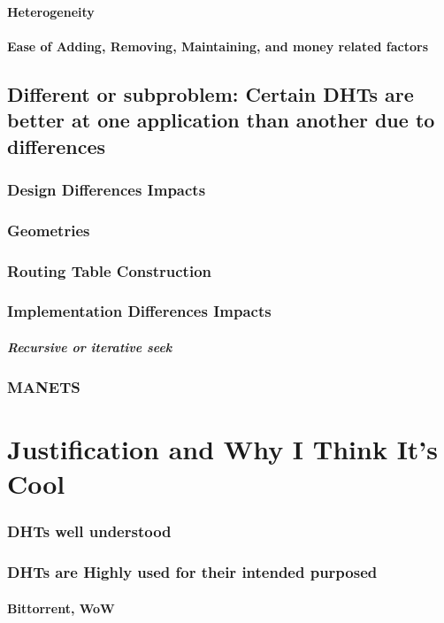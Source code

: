 \documentclass[10pt,letterpaper]{report}
\begin{document}
\subsubsection{Heterogeneity}
\subsubsection{Ease of Adding, Removing, Maintaining, and money related factors}

\section{Different or subproblem: Certain DHTs are better at one application than another due to differences}
\subsection{Design Differences Impacts}
\subsection{Geometries}
\subsection{Routing Table Construction}
\subsection{Implementation Differences Impacts}
\paragraph{Recursive or iterative seek}


\subsection{MANETS}
\chapter{Justification and Why I Think It's Cool}
\subsection{DHTs well understood}
\subsection{DHTs are Highly used for their intended purposed}
\subsubsection{Bittorrent, WoW}
\end{document}
